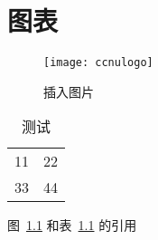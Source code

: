 
\chapter{图表}


\begin{figure}[htbp]
  \centering
  \texttt{[image: ccnulogo]}
  \caption{插入图片}
  \label{figure:test1}
\end{figure}

\begin{table}[htbp]
  \centering
  \caption{测试}
  \label{table:test1}
  \begin{tabular}{|c|c|}
    11 & 22 \\
    33 & 44 
  \end{tabular}
\end{table}


图~\ref{figure:test1} 和表~\ref{table:test1} 的引用
